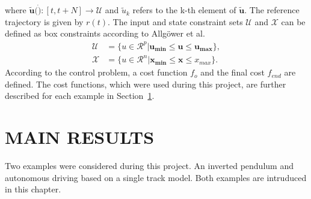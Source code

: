 \documentclass[letterpaper, 10 pt, conference]{ieeeconf}  %
\begin{document}
where $\boldsymbol{\tilde{u}}(\dot):[t,t+N] \rightarrow \mathcal{U}$ and $\tilde{u}_k$ refers to the k-th element of $\boldsymbol{\tilde{u}}$. The reference trajectory is given by $r(t)$. The input and state constraint sets $\mathcal{U}$ and $\mathcal{X}$ can be defined as box constraints according to Allgöwer et al.~\cite{allgeowernonlinear}
\begin{align}
\mathcal{U} &= \{u \in \mathcal{R}^p|\boldsymbol{u_{min}}\leq \boldsymbol{u} \leq \boldsymbol{u_{max}}\},\\
\mathcal{X} &= \{u \in \mathcal{R}^n|\boldsymbol{x_{min}}\leq \boldsymbol{x} \leq x_{max}\}.
\end{align}
According to the control problem, a cost function $f_o$ and the final cost $f_{end}$ are defined. The cost functions, which were used during this project, are further described for each example in Section~\ref{main_results}.



\section{MAIN RESULTS}\label{main_results}
Two examples were considered during this project. An inverted pendulum and autonomous driving based on a single track model. Both examples are intruduced in this chapter.\\
\end{document}
